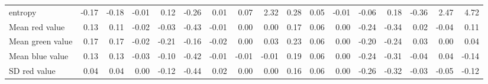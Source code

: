 \documentclass{article}
\begin{document}
\begin{table}[!ht]
{\begin{tabular}{lrrrrrrrrrrrrrrrr}
entropy                                                                 & -0.17                    & -0.18                    & -0.01                    & 0.12                     & -0.26                    & 0.01                     & 0.07                     & 2.32                     & 0.28                     & 0.05                     & -0.01                    & -0.06                    & 0.18                     & -0.36                    & 2.47                     & 4.72                     \\
Mean red value                                                          & 0.13                     & 0.11                     & -0.02                    & -0.03                    & -0.43                    & -0.01                    & 0.00                     & 0.00                     & 0.17                     & 0.06                     & 0.00                     & -0.24                    & -0.34                    & 0.02                     & -0.04                    & 0.11                     \\
Mean green value                                                        & 0.17                     & 0.17                     & -0.02                    & -0.21                    & -0.16                    & -0.02                    & 0.00                     & 0.03                     & 0.23                     & 0.06                     & 0.00                     & -0.20                    & -0.24                    & 0.03                     & 0.00                     & 0.04                     \\
Mean blue value                                                         & 0.13                     & 0.13                     & -0.03                    & -0.10                    & -0.42                    & -0.01                    & -0.01                    & -0.01                    & 0.19                     & 0.06                     & 0.00                     & -0.24                    & -0.31                    & -0.04                    & 0.04                     & -0.14                    \\
SD red value                                                            & 0.04                     & 0.04                     & 0.00                     & -0.12                    & -0.44                    & 0.02                     & 0.00                     & 0.00                     & 0.16                     & 0.06                     & 0.00                     & -0.26                    & -0.32                    & -0.03                    & -0.05                    & -0.12                    \\

\end{tabular}}
\end{table}
\end{document}
